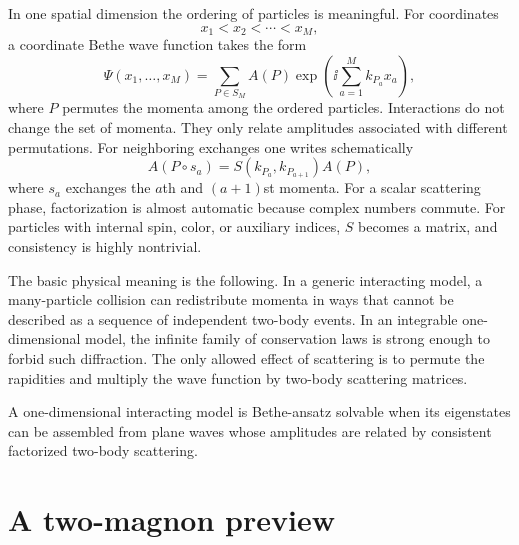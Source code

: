 In one spatial dimension the ordering of particles is meaningful.  For
coordinates
\begin{equation}
    x_1<x_2<\cdots<x_M,
\end{equation}
a coordinate Bethe wave function takes the form
\begin{equation}
\label{eq:coordinate-ba-wavefunction-preview}
    \Psi(x_1,\ldots,x_M)
    =
    \sum_{P\in S_M} A(P)
    \exp\left(\ii\sum_{a=1}^{M}k_{P_a}x_a\right),
\end{equation}
where $P$ permutes the momenta among the ordered particles.  Interactions do not
change the set of momenta.  They only relate amplitudes associated with different
permutations.  For neighboring exchanges one writes schematically
\begin{equation}
\label{eq:two-body-scattering-amplitude-preview}
    A(P\circ s_a)
    =S(k_{P_a},k_{P_{a+1}})A(P),
\end{equation}
where $s_a$ exchanges the $a$th and $(a+1)$st momenta.  For a scalar scattering
phase, factorization is almost automatic because complex numbers commute.  For
particles with internal spin, color, or auxiliary indices, $S$ becomes a matrix,
and consistency is highly nontrivial.

The basic physical meaning is the following.  In a generic interacting model, a
many-particle collision can redistribute momenta in ways that cannot be described
as a sequence of independent two-body events.  In an integrable one-dimensional
model, the infinite family of conservation laws is strong enough to forbid such
diffraction.  The only allowed effect of scattering is to permute the rapidities
and multiply the wave function by two-body scattering matrices.

\begin{principle}
A one-dimensional interacting model is Bethe-ansatz solvable when its eigenstates
can be assembled from plane waves whose amplitudes are related by consistent
factorized two-body scattering.
\end{principle}

\section{A two-magnon preview}
\label{sec:two-magnon-preview}

